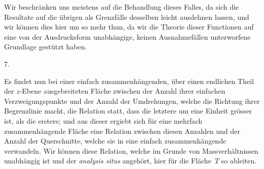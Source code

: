 \documentclass[a4paper,12pt,leqno]{article}
\begin{document}
Wir beschr\"{a}nken uns meistens auf die Behandlung dieses
Falles, da sich die Resultate auf die \"{u}brigen als
Grenzf\"{a}lle desselben leicht ausdehnen lassen, und wir
k\"{o}nnen dies hier um so mehr thun, da wir die Theorie dieser
Functionen auf eine von der Ausdrucksform unabh\"{a}ngige, keinen
Ausnahmef\"{a}llen unterworfene Grundlage gest\"{u}tzt haben.

\medbreak

\centerline{7.}

\nobreak\medskip

Es findet nun bei einer einfach zusammenh\"{a}ngenden, \"{u}ber
einen endlichen Theil der $z$-Ebene ausgebreiteten Fl\"{a}che
zwischen der Anzahl ihrer einfachen Verzweigungspunkte und der
Anzahl der Umdrehungen, welche die Richtung ihrer Begrenzlinie
macht, die Relation statt, dass die letztere um eine Einheit
gr\"{o}sser ist, als die erstere; und aus dieser ergiebt sich
f\"{u}r eine mehrfach zusammenh\"{a}ngende Fl\"{a}che eine
Relation zwischen diesen Anzahlen und der Anzahl der
Querschnitte, welche sie in eine einfach zusammenh\"{a}ngende
verwandeln.  Wir k\"{o}nnen diese Relation, welche im Grunde von
Massverh\"{a}ltnissen unabh\"{a}ngig ist und der \emph{analysis
situs} angeh\"{o}rt, hier f\"{u}r die Fl\"{a}che~$T$ so ableiten.
\end{document}
